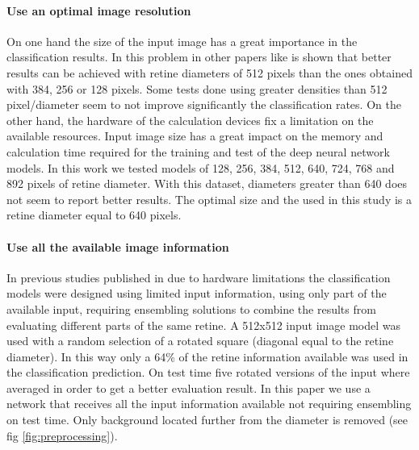 \documentclass[preprint]{elsarticle}
\theoremstyle{definition} %
\theoremstyle{remark}
\begin{document}
\paragraph{Use an optimal image resolution} On one hand the size of the input image has a great importance in the classification results. In this problem in other papers like \cite{jdelatorre-2016} is shown that better results can be achieved with retine diameters of 512 pixels than the ones obtained with 384, 256 or 128 pixels. Some tests done using greater densities than 512 pixel/diameter seem to not improve significantly the classification rates. On the other hand, the hardware of the calculation devices fix a limitation on the available resources. Input image size has a great impact on the memory and calculation time required for the training and test of the deep neural network models. In this work we tested models of 128, 256, 384, 512, 640, 724, 768 and 892 pixels of retine diameter. With this dataset, diameters greater than 640 does not seem to report better results. The optimal size and the used in this study is a retine diameter equal to 640 pixels.

\paragraph{Use all the available image information} In previous studies published in \citep{jdelatorre-2016} due to hardware limitations the classification models were designed using limited input information, using only part of the available input, requiring ensembling solutions to combine the results from evaluating different parts of the same retine. A 512x512 input image model was used with a random selection of a rotated square (diagonal equal to the retine diameter). In this way only a 64\% of the retine information available was used in the classification prediction. On test time five rotated versions of the input where averaged in order to get a better evaluation result. In this paper we use a network that receives all the input information available not requiring ensembling on test time. Only background located further from the diameter is removed (see fig \ref{fig:preprocessing}).
\end{document}
